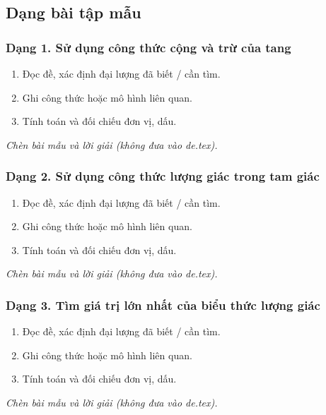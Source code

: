 

\subsection{Dạng bài tập mẫu}
\subsubsection{Dạng 1. Sử dụng công thức cộng và trừ của tang}
\begin{phuongphap}
\begin{enumerate}
\item Đọc đề, xác định đại lượng đã biết / cần tìm.
\item Ghi công thức hoặc mô hình liên quan.
\item Tính toán và đối chiếu đơn vị, dấu.
\end{enumerate}
\end{phuongphap}
\begin{vidumau}
\textit{Chèn bài mẫu và lời giải (không đưa vào de.tex).}
\end{vidumau}

\subsubsection{Dạng 2. Sử dụng công thức lượng giác trong tam giác}
\begin{phuongphap}
\begin{enumerate}
\item Đọc đề, xác định đại lượng đã biết / cần tìm.
\item Ghi công thức hoặc mô hình liên quan.
\item Tính toán và đối chiếu đơn vị, dấu.
\end{enumerate}
\end{phuongphap}
\begin{vidumau}
\textit{Chèn bài mẫu và lời giải (không đưa vào de.tex).}
\end{vidumau}

\subsubsection{Dạng 3. Tìm giá trị lớn nhất của biểu thức lượng giác}
\begin{phuongphap}
\begin{enumerate}
\item Đọc đề, xác định đại lượng đã biết / cần tìm.
\item Ghi công thức hoặc mô hình liên quan.
\item Tính toán và đối chiếu đơn vị, dấu.
\end{enumerate}
\end{phuongphap}
\begin{vidumau}
\textit{Chèn bài mẫu và lời giải (không đưa vào de.tex).}
\end{vidumau}

